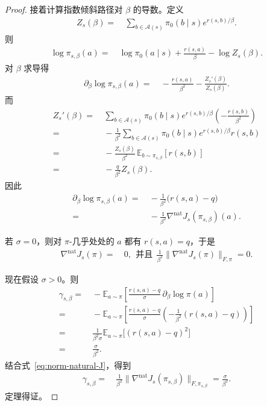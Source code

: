 \begin{proof}
接着计算指数倾斜路径对 $\beta$ 的导数。定义
\begin{align*}
Z_s(\beta)= &~ \sum_{b\in\mathcal{A}(s) }\pi_0(b\mid s)e^{r(s,b)/\beta}.
\end{align*}
则
\begin{align*}
\log \pi_{s,\beta}(a)
= &~ \log \pi_0(a\mid s) + \frac{r(s,a)}{\beta} - \log Z_s(\beta).
\end{align*}
对 $\beta$ 求导得
\begin{align*}
\partial_\beta \log \pi_{s,\beta}(a)
= &~ -\frac{r(s,a)}{\beta^2} - \frac{Z_s'(\beta)}{Z_s(\beta)}.
\end{align*}
而
\begin{align*}
Z_s'(\beta)
= &~ \sum_{b\in\mathcal{A}(s) }\pi_0(b\mid s)e^{r(s,b)/\beta}\left(-\frac{r(s,b)}{\beta^2}\right) \\
= &~ -\frac{1}{\beta^2}\sum_{b\in\mathcal{A}(s) }\pi_0(b\mid s)e^{r(s,b)/\beta}r(s,b) \\
= &~ -\frac{Z_s(\beta)}{\beta^2}\,\mathbb E_{b\sim\pi_{s,\beta}}[r(s,b)] \\
= &~ -\frac{q}{\beta^2}Z_s(\beta).
\end{align*}
因此
\begin{align*}
\partial_\beta \log \pi_{s,\beta}(a)
= &~ -\frac{1}{\beta^2}\bigl(r(s,a)-q\bigr) \\
= &~ -\frac{1}{\beta^2}\nabla^{\mathrm{nat}}J_s(\pi_{s,\beta})(a).
\end{align*}

若 $\sigma=0$，则对 $\pi$-几乎处处的 $a$ 都有 $r(s,a)=q$，于是
\begin{align*}
\nabla^{\mathrm{nat}}J_s(\pi)= &~ 0, ~~\text{并且}~~ \frac{1}{\beta^2}\bigl\|\nabla^{\mathrm{nat}}J_s(\pi)\bigr\|_{F,\pi}= 0.
\end{align*}

现在假设 $\sigma>0$。则
\begin{align*}
\gamma_{s,\beta}
= &~ -\mathbb E_{a\sim\pi}
\left[
\frac{r(s,a)-q}{\sigma}\,\partial_\beta \log \pi(a)
\right] \\
= &~ -\mathbb E_{a\sim\pi}
\left[
\frac{r(s,a)-q}{\sigma}\left(-\frac{1}{\beta^2}(r(s,a)-q)\right)
\right] \\
= &~ \frac{1}{\beta^2\sigma}\mathbb E_{a\sim\pi}\bigl[(r(s,a)-q)^2\bigr] \\
= &~ \frac{\sigma}{\beta^2}.
\end{align*}
结合式~\eqref{eq:norm-natural-J}，得到
\begin{align*}
\gamma_{s,\beta}
= &~ \frac{1}{\beta^2}\bigl\|\nabla^{\mathrm{nat}}J_s(\pi_{s,\beta})\bigr\|_{F,\pi_{s,\beta}} = \frac{\sigma}{\beta^2}.
\end{align*}
定理得证。
\end{proof}

